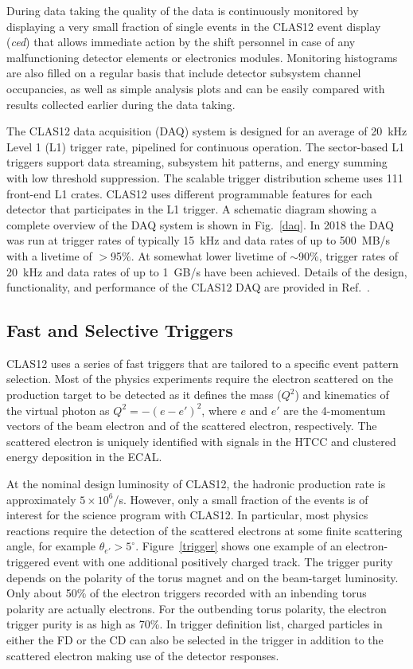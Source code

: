 \documentclass[final,3p]{elsarticle}
\begin{document}
\begin{twocolumn}
During data taking the quality of the data is continuously monitored by displaying a very small fraction of single
events in the CLAS12 event display ({\it ced}) that allows immediate action by the shift personnel in case of any
malfunctioning detector elements or electronics modules. Monitoring histograms are also filled on a regular basis
that include detector subsystem channel occupancies, as well as simple analysis plots and can be easily compared with
results collected earlier during the data taking.  

The CLAS12 data acquisition (DAQ) system is designed for an average of 20~kHz Level 1 (L1) trigger rate, pipelined
for continuous operation. The sector-based  L1 triggers support data streaming, subsystem hit patterns, and energy
summing with low threshold suppression.  The scalable trigger distribution scheme uses 111 front-end L1 crates.
CLAS12 uses different programmable features for each detector that participates in the L1 trigger. A schematic
diagram showing a complete overview of the DAQ system is shown in Fig.~\ref{daq}. In 2018 the DAQ was run at
trigger rates of typically 15~kHz and data rates of up to 500~MB/s with a livetime of $>$95\%. At somewhat lower
livetime of $\sim$90\%, trigger rates of 20~kHz and data rates of up to 1~GB/s have been achieved. Details of the
design, functionality, and performance of the CLAS12 DAQ are provided in Ref.~\cite{DAQ}. 
 
\subsection{Fast and Selective Triggers} 

CLAS12 uses a series of fast triggers that are tailored to a specific event pattern selection. Most of the physics
experiments require the electron scattered on the production target to be detected as it defines the mass ($Q^2$)
and kinematics of the virtual photon as $Q^2 = -(e - e')^2$, where $e$ and $e'$ are the 4-momentum vectors of the
beam electron and of the scattered electron, respectively. The scattered electron is uniquely identified with signals in
the HTCC and clustered energy deposition in the ECAL. 

At the nominal design luminosity of CLAS12, the hadronic production rate is approximately $5 \times 10^6$/s.
However, only a small fraction of the events is of interest for the science program with CLAS12. In particular, most
physics reactions require the detection of the scattered electrons at some finite scattering angle, for example
$\theta_{e'} > 5^\circ$.  Figure~\ref{trigger} shows one example of an electron-triggered event with one additional
positively charged track. The trigger purity depends on the polarity of the torus magnet and on the beam-target
luminosity. Only about 50\% of the electron triggers recorded with an inbending torus polarity are actually electrons.
For the outbending torus polarity, the electron trigger purity is as high as 70\%. In trigger definition list, charged
particles in either the FD or the CD can also be selected in the trigger in addition to the scattered electron making
use of the detector responses.    
   

\end{twocolumn}
\end{document}
